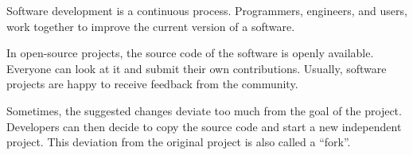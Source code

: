 
Software development is a continuous process. Programmers, engineers, and users, work together to improve the current version of a software.

In open-source projects, the source code of the software is openly available. Everyone can look at it and submit their own contributions. Usually, software projects are happy to receive feedback from the community.

Sometimes, the suggested changes deviate too much from the goal of the project. Developers can then decide to copy the source code and start a new independent project. This deviation from the original project is also called a ``fork''.

